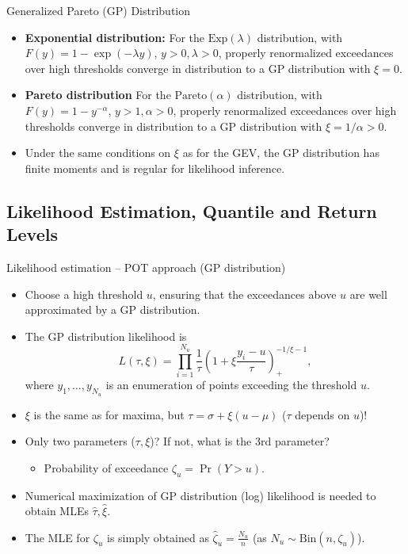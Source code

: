 \documentclass[10pt, hyperref={colorlinks = true,linkcolor = blue}]{beamer}
\begin{document}
{{\begin{frame}{Generalized Pareto (GP) Distribution}
\begin{itemize}
    \item \textbf{Exponential distribution:} For the \(\text{Exp}(\lambda)\) distribution, with \(F(y) = 1 - \exp(-\lambda y)\), \(y > 0, \lambda > 0\), properly renormalized exceedances over high thresholds converge in distribution to a GP distribution with \(\xi = 0\).
  
    \item \textbf{Pareto distribution} For the \(\text{Pareto}(\alpha)\) distribution, with \(F(y) = 1 - y^{-\alpha}\), \(y > 1, \alpha > 0\), properly renormalized exceedances over high thresholds converge in distribution to a GP distribution with \(\xi = 1/\alpha > 0\).

    \item Under the same conditions on \(\xi\) as for the GEV, the GP distribution has finite moments and is regular for likelihood inference.
\end{itemize}
\end{frame}

{\subsection{Likelihood Estimation, Quantile and Return Levels}
\begin{frame}{Likelihood estimation -- POT approach (GP distribution)}
\begin{itemize}
    \item Choose a high threshold \( u \), ensuring that the exceedances above \( u \) are well approximated by a GP distribution.
    \item The GP distribution likelihood is
    \[
    L(\tau, \xi) = \prod_{i=1}^{N_u} \frac{1}{\tau} \left( 1 + \xi \frac{y_i - u}{\tau} \right)^{-1/\xi - 1}_{+},
    \]
    where \( y_1, \ldots, y_{N_u} \) is an enumeration of points exceeding the threshold \( u \).

    \item \(\xi\) is the same as for maxima, but \(\tau = \sigma + \xi(u - \mu)\) (\(\tau\) depends on \( u \))!
    \item Only two parameters (\(\tau, \xi\))? If not, what is the 3rd parameter?
    \begin{itemize}
        \item Probability of exceedance \(\zeta_u = \Pr(Y > u)\).
    \end{itemize}

    \item Numerical maximization of GP distribution (log) likelihood is needed to obtain MLEs \(\hat{\tau}, \hat{\xi}\).
    \item The MLE for \(\zeta_u\) is simply obtained as \(\hat{\zeta}_u = \frac{N_u}{n}\) (as \(N_u \sim \text{Bin}(n, \zeta_u)\)).
\end{itemize}


\end{frame}}}}
\end{document}
